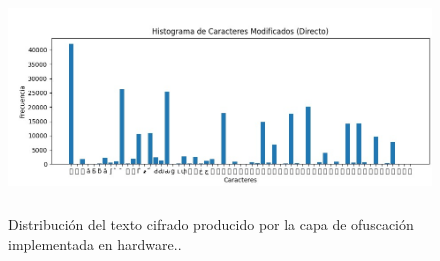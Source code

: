 \begin{figure}[h!] %
    \centering %
     \includegraphics[width=1\textwidth, height=6cm]{imagenes/img17} %
    \caption{ Distribución del texto cifrado producido por la capa de ofuscación implementada en hardware..}
    \label{fig:imagen17} %
\end{figure} 




\endinput 